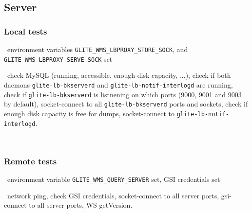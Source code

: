 \subsection{Server}

\subsubsection{Local tests}
\req\ environment variables \texttt{GLITE\_WMS\_LBPROXY\_STORE\_SOCK},
and \texttt{GLITE\_WMS\_LBPROXY\_SERVE\_SOCK} set

\what\ check MySQL (running, accessible, enough disk capacity, ...),
check if both daemons \texttt{glite-lb-bkserverd} and \texttt{glite-lb-notif-interlogd} are running,
check if \texttt{glite-lb-bkserverd} is listnening on which ports (9000, 9001 and 9003 by default),
socket-connect to all \texttt{glite-lb-bkserverd} ports and sockets,
check if enough disk capacity is free for dumps,
socket-connect to \texttt{glite-lb-notif-interlogd}.

\how\ 


\subsubsection{Remote tests}
\req\ environment variable \texttt{GLITE\_WMS\_QUERY\_SERVER} set, GSI credentials set

\what\ network ping,
check GSI credentials,
socket-connect to all server ports,
gsi-connect to all server ports,
WS getVersion.

\how\ 



